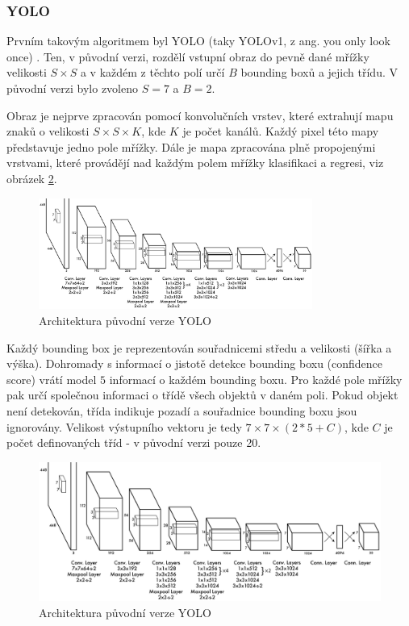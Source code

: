 \subsubsection{YOLO}
Prvním takovým algoritmem byl YOLO (taky YOLOv1, z ang. you only look once)
\cite{yolo}. Ten, v původní verzi, rozdělí vstupní obraz do pevně dané mřížky
velikosti $S \times S$ a v každém z těchto polí určí $B$ bounding boxů a jejich
třídu. V původní verzi bylo zvoleno $S = 7$ a $B = 2$.

Obraz je nejprve zpracován pomocí konvolučních vrstev, které extrahují mapu
znaků o velikosti $S \times S \times K$, kde $K$ je počet kanálů. Každý pixel
této mapy představuje jedno pole mřížky. Dále je mapa zpracována plně
propojenými vrstvami, které provádějí nad každým polem mřížky klasifikaci a
regresi, viz obrázek \ref{fig:yolo}.

\begin{figure}[]
    \centering
    \includegraphics[width=0.8\textwidth]{Figures/yolo}
    \caption{Architektura původní verze YOLO \cite{yolo}}
    \label{fig:yolo}
\end{figure}

Každý bounding box je reprezentován souřadnicemi středu a velikosti (šířka a
výška). Dohromady s informací o jistotě detekce bounding boxu (confidence
score) vrátí model $5$ informací o každém bounding boxu. Pro každé pole mřížky
pak určí společnou informaci o třídě všech objektů v daném poli. Pokud objekt
není detekován, třída indikuje pozadí a souřadnice bounding boxu jsou
ignorovány. Velikost výstupního vektoru je tedy $7 \times 7 \times (2 * 5 +
    C)$, kde $C$ je počet definovaných tříd - v původní verzi pouze 20.

\begin{figure}[]
    \centering
    \includegraphics[width=\textwidth]{Figures/yolo}
    \caption{Architektura původní verze YOLO \cite{yolo}}
    \label{fig:yolo}
\end{figure}

